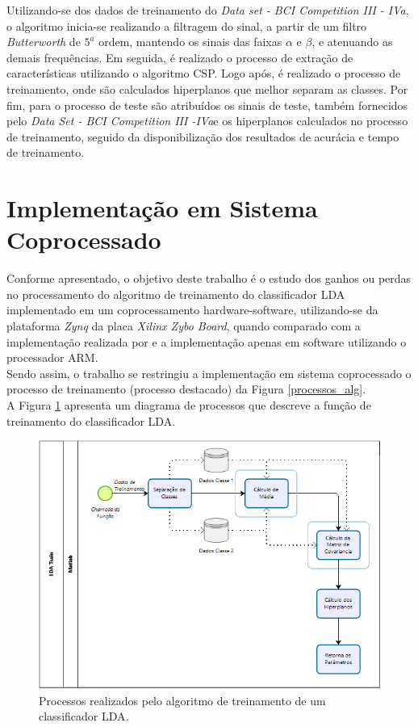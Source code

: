 Utilizando-se dos dados de treinamento do \textit{Data set - BCI Competition III - IVa}, o algoritmo inicia-se realizando a filtragem do sinal, a partir de um filtro \textit{Butterworth} de {$5^a$} ordem, mantendo os sinais das faixas {$\alpha$} e {$\beta$}, e atenuando as demais frequências. Em seguida, é realizado o processo de extração de características utilizando o algoritmo CSP. Logo após, é realizado o processo de treinamento, onde são calculados hiperplanos que melhor separam as classes. Por fim, para o processo de teste são atribuídos os sinais de teste, também fornecidos pelo \textit{Data Set - BCI Competition III -IVa}e os hiperplanos calculados no processo de treinamento, seguido da disponibilização dos resultados de acurácia e tempo de treinamento.

\section{Implementação em Sistema Coprocessado}

Conforme apresentado, o objetivo deste trabalho é o estudo dos ganhos ou perdas no processamento do algoritmo de treinamento do classificador LDA implementado em um coprocessamento hardware-software, utilizando-se da plataforma \textit{Zynq} da placa \textit{Xilinx Zybo Board}, quando comparado com a implementação realizada por \cite{F.Lotte} e a implementação apenas em software utilizando o processador ARM.\\
Sendo assim, o trabalho se restringiu a implementação em sistema coprocessado o processo de treinamento (processo destacado) da Figura \ref{processos_alg}.\\
A Figura \ref{processos_train} apresenta um diagrama de processos que descreve a função de treinamento do classificador LDA.

\begin{figure}[h]
	\centering
	\includegraphics[keepaspectratio=true,scale=0.6]{figuras/Processos_LDA_Train.PNG}
	\caption{Processos realizados pelo algoritmo de treinamento de um classificador LDA.}
	\label{processos_train}
\end{figure}

